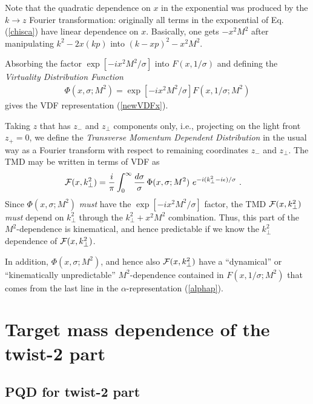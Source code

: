 \documentclass[final,5p,times,twocolumn]{elsarticle}
\begin{document}
Note that the quadratic dependence on $x$ in the exponential
was produced by the  $k \to z$  Fourier transformation:  originally  all terms 
in the exponential of Eq. (\ref{chisca}) 
have  linear dependence on $x$. Basically,  one gets $-x^2 M^2$
after  manipulating  $k^2-2x (kp) $ into \mbox{$ (k-xp)^2 - x^2 M^2$.}

Absorbing the factor $\exp [-ix^2  M^2/\sigma]$ into $F  (x, 1/\sigma)$
and defining  the   {\it Virtuality Distribution Function} 
 \begin{align}
\Phi  (x, \sigma; M^2) = 
\exp [-ix^2  M^2/\sigma] F  (x, 1/\sigma; M^2)
\label{Phidef}
\end{align} 
gives  the  VDF representation (\ref{newVDFx}). 


Taking $z$ that has 
 $z_-$ and $z_\perp$ components only, i.e.,
 projecting on the light front $z_+=0$,  
 we define   the {\it Transverse Momentum Dependent Distribution} 
 in the  usual way 
  as a Fourier transform
with respect to remaining  coordinates   $z_-$ and $z_\perp$. 
The TMD may be written in terms of VDF as  
\begin{align}
&{\cal  F} (x, k_\perp^2) =  \frac{i }{\pi} 
\int_{0}^{\infty} \frac{d \sigma }{\sigma} \, 
 \Phi (x,\sigma; M^2) \,  \,  
 e^{- i (k_\perp^2-i \epsilon )/ \sigma} \  .  
\label{TMDsig} 
\end{align} Since $ \Phi (x,\sigma; M^2) $  {\it must} have the
$\exp [-ix^2  M^2/\sigma]$ factor, the TMD 
${\cal  F} (x, k_\perp^2)$ {\it must}  depend on $k_\perp^2$
through the \mbox{$k_\perp^2 +x^2 M^2$}  combination. 
Thus, this part of the $M^2$-dependence is  
 kinematical, and hence  predictable if we know the $k_\perp^2$
 dependence of  ${\cal  F} (x, k_\perp^2) $. 
 
In addition,  $ \Phi (x,\sigma; M^2) $, and hence also  ${\cal  F} (x, k_\perp^2) $ 
have a  ``dynamical''  or ``kinematically unpredictable''
$M^2$-dependence contained in
$F  (x, 1/\sigma; M^2)$ that comes from the last line in the 
$\alpha$-representation (\ref{alphap}). 

  
 \setcounter{equation}{0}  

\section{Target mass dependence  of  the twist-2 part}

\subsection{PQD for twist-2 part}
\end{document}
